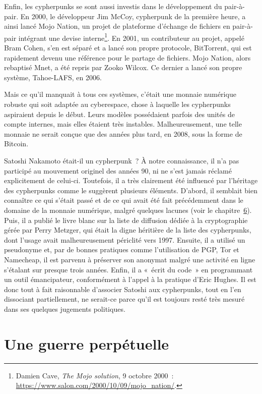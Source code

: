 \documentclass[
  a5paper,
  smalldemyvopaper,10pt,twoside,onecolumn,openright,extrafontsizes,hidelinks]{memoir}
\begin{document}
Enfin, les cypherpunks se sont aussi investis dans le développement du
pair-à-pair. En 2000, le développeur Jim McCoy, cypherpunk de la
première heure, a ainsi lancé Mojo Nation, un projet de plateforme
d'échange de fichiers en pair-à-pair intégrant une devise
interne\footnote{Damien Cave, \emph{The Mojo solution}, 9 octobre 2000~:
  \url{https://www.salon.com/2000/10/09/mojo_nation/}.}. En 2001, un
contributeur au projet, appelé Bram Cohen, s'en est séparé et a lancé
son propre protocole, BitTorrent, qui est rapidement devenu une
référence pour le partage de fichiers. Mojo Nation, alors rebaptisé
Mnet, a été repris par Zooko Wilcox. Ce dernier a lancé son propre
système, Tahoe-LAFS, en 2006.

Mais ce qu'il manquait à tous ces systèmes, c'était une monnaie
numérique robuste qui soit adaptée au cyberespace, chose à laquelle les
cypherpunks aspiraient depuis le début. Leurs modèles possédaient
parfois des unités de compte internes, mais elles étaient très
instables. Malheureusement, une telle monnaie ne serait conçue que des
années plus tard, en 2008, sous la forme de Bitcoin.

Satoshi Nakamoto était-il un cypherpunk~? À notre connaissance, il n'a
pas participé au mouvement originel des années 90, ni ne s'est jamais
réclamé explicitement de celui-ci. Toutefois, il a très clairement été
influencé par l'héritage des cypherpunks comme le suggèrent plusieurs
éléments. D'abord, il semblait bien connaître ce qui s'était passé et de
ce qui avait été fait précédemment dans le domaine de la monnaie
numérique, malgré quelques lacunes (voir le
chapitre~\hyperref[ch:cybermonnaie]{6}). Puis, il a publié le livre
blanc sur la liste de diffusion dédiée à la cryptographie gérée par
Perry Metzger, qui était la digne héritière de la liste des cypherpunks,
dont l'usage avait malheureusement périclité vers 1997. Ensuite, il a
utilisé un pseudonyme et, par de bonnes pratiques comme l'utilisation de
PGP, Tor et Namecheap, il est parvenu à préserver son anonymat malgré
une activité en ligne s'étalant sur presque trois années. Enfin, il a
«~écrit du code~» en programmant un outil émancipateur, conformément à
l'appel à la pratique d'Eric Hughes. Il est donc tout à fait raisonnable
d'associer Satoshi aux cypherpunks, tout en l'en dissociant
partiellement, ne serait-ce parce qu'il est toujours resté très mesuré
dans ses quelques jugements politiques.

\section*{Une guerre perpétuelle}\label{une-guerre-perpuxe9tuelle}
\end{document}

